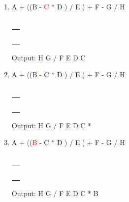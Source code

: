 \documentclass[a4paper]{article}
\begin{document}
\begin{large}
\begin{enumerate}
          \renewcommand{\arraystretch}{1.3} \item
          A + ((B -   \textcolor{red}{C} * D ) / E ) + F - G / H\\\\
          \begin{tabular}[t]{ | p{1em} | }
            \makecell{*} \\ \hline
            \makecell{)} \\ \hline
            \makecell{/} \\ \hline
            \makecell{)} \\ \hline
            \makecell{+} \\\hline
            \makecell{-} \\\hline
          \end{tabular}
          \hspace{2em}
          Output: H G / F E D C

          \renewcommand{\arraystretch}{1.3} \item
          A + ((B \textcolor{red}{-} C * D ) / E ) + F - G / H\\\\
          \begin{tabular}[t]{ | p{1em} | }
            \makecell{-} \\ \hline
            \makecell{)} \\ \hline
            \makecell{/} \\ \hline
            \makecell{)} \\ \hline
            \makecell{+} \\\hline
            \makecell{-} \\\hline
          \end{tabular}
          \hspace{2em}
          Output: H G / F E D C *

          \renewcommand{\arraystretch}{1.3} \item
          A + ((\textcolor{red}{B} - C * D ) / E ) + F - G / H\\\\
          \begin{tabular}[t]{ | p{1em} | }
            \makecell{-} \\ \hline
            \makecell{)} \\ \hline
            \makecell{/} \\ \hline
            \makecell{)} \\ \hline
            \makecell{+} \\\hline
            \makecell{-} \\\hline
          \end{tabular}
          \hspace{2em}
          Output: H G / F E D C * B


\end{enumerate}
\end{large}
\end{document}
